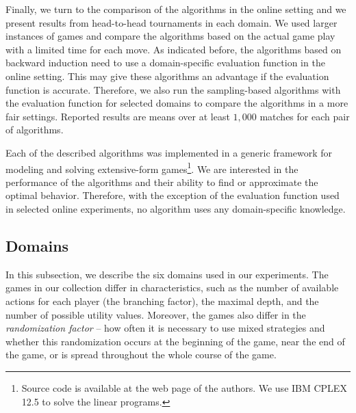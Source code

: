 Finally, we turn to the comparison of the algorithms in the online setting and we present results from head-to-head tournaments in each domain.
We used larger instances of games and compare the algorithms based on the actual game play with a limited time for each move. 
As indicated before, the algorithms based on backward induction need to use a domain-specific evaluation function in the online setting.
This may give these algorithms an advantage if the evaluation function is accurate.
Therefore, we also run the sampling-based algorithms with the evaluation function for selected domains to compare the algorithms in a more fair settings.
Reported results are means over at least $1,000$ matches for each pair of algorithms.

Each of the described algorithms was implemented in a generic framework for modeling and solving extensive-form games\footnote{Source code is available at the web page of the authors. %
We use IBM CPLEX 12.5 to solve the linear programs.}.
We are interested in the performance of the algorithms and their ability to find or approximate the optimal behavior.
Therefore, with the exception of the evaluation function used in selected online experiments, no algorithm uses any domain-specific knowledge.


\subsection{Domains}\label{sec:eval:domains}

In this subsection, we describe the six domains used in our experiments.
The games in our collection differ in characteristics, such as the number of available actions for each player (\ie the branching factor), the maximal depth, and the number of possible utility values.
Moreover, the games also differ in the \emph{randomization factor} -- \ie how often it is necessary to use mixed strategies and whether this randomization occurs at the beginning of the game, near the end of the game, or is spread throughout the whole course of the game.

